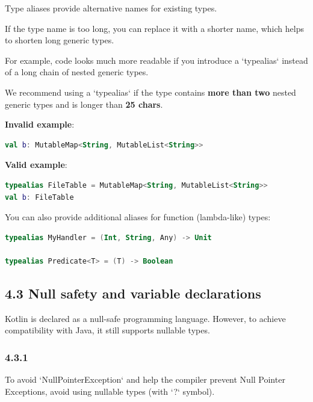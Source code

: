{{{{Type aliases provide alternative names for existing types.

If the type name is too long, you can replace it with a shorter name, which helps to shorten long generic types.

For example, code looks much more readable if you introduce a `typealias` instead of a long chain of nested generic types.

We recommend using a `typealias` if the type contains \textbf{more than two} nested generic types and is longer than \textbf{25 chars}.



\textbf{Invalid example}:

\begin{lstlisting}[language=Kotlin]
val b: MutableMap<String, MutableList<String>>
\end{lstlisting}


\textbf{Valid example}:

\begin{lstlisting}[language=Kotlin]
typealias FileTable = MutableMap<String, MutableList<String>>
val b: FileTable
\end{lstlisting}


You can also provide additional aliases for function (lambda-like) types:

\begin{lstlisting}[language=Kotlin]
typealias MyHandler = (Int, String, Any) -> Unit

typealias Predicate<T> = (T) -> Boolean
\end{lstlisting}


\subsection*{\textbf{4.3 Null safety and variable declarations}}

Kotlin is declared as a null-safe programming language. However, to achieve compatibility with Java, it still supports nullable types.



\subsubsection*{\textbf{4.3.1}}
\leavevmode\newline

To avoid `NullPointerException` and help the compiler prevent Null Pointer Exceptions, avoid using nullable types (with `?` symbol).



}}}}
